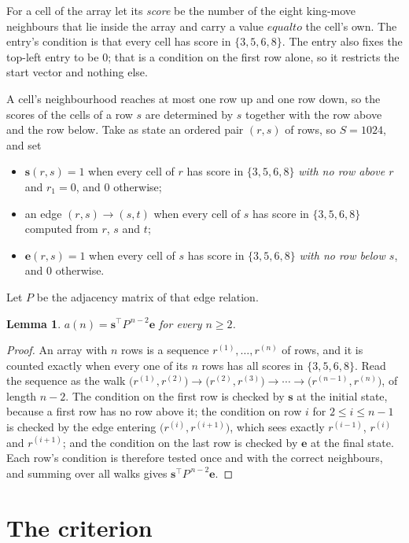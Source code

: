 \documentclass[11pt,a4paper]{article}
\theoremstyle{plain}
\newtheorem{lemma}[theorem]{Lemma}
\theoremstyle{definition}
\begin{document}
For a cell of the array let its \emph{score} be the number of the eight king-move neighbours that lie inside
the array and carry a value $equal to$ the cell's own. The entry's condition is that every cell
has score in $\{3,5,6,8\}$. The entry also fixes the top-left entry to be $0$; that is a condition on the first row alone, so it restricts the start vector and nothing else.

A cell's neighbourhood reaches at most one row up and one row down, so the scores of the
cells of a row $s$ are determined by $s$ together with the row above and the row below.
Take as state an ordered pair $(r,s)$ of rows, so $S=1024$, and set
\begin{itemize}
\item $\mathbf{s}(r,s)=1$ when every cell of $r$ has score in $\{3,5,6,8\}$ \emph{with no row
above $r$} and $r_1=0$, and $0$ otherwise;
\item an edge $(r,s)\to(s,t)$ when every cell of $s$ has score in $\{3,5,6,8\}$ computed from
$r$, $s$ and $t$;
\item $\mathbf{e}(r,s)=1$ when every cell of $s$ has score in $\{3,5,6,8\}$ \emph{with no row
below $s$}, and $0$ otherwise.
\end{itemize}
Let $P$ be the adjacency matrix of that edge relation.

\begin{lemma}\label{lem:walk}
$a(n)=\mathbf{s}^{\!\top}P^{\,n-2}\mathbf{e}$ for every $n\ge2$.
\end{lemma}

\begin{proof}
An array with $n$ rows is a sequence $r^{(1)},\dots,r^{(n)}$ of rows, and it is counted
exactly when every one of its $n$ rows has all scores in $\{3,5,6,8\}$. Read the sequence as the
walk $\bigl(r^{(1)},r^{(2)}\bigr)\to\bigl(r^{(2)},r^{(3)}\bigr)\to\cdots\to
\bigl(r^{(n-1)},r^{(n)}\bigr)$, of length $n-2$. The condition on the first row is
checked by $\mathbf{s}$ at the initial state, because a first row has no row above it; the
condition on row $i$ for $2\le i\le n-1$ is checked by the edge entering
$\bigl(r^{(i)},r^{(i+1)}\bigr)$, which sees exactly $r^{(i-1)}$, $r^{(i)}$ and
$r^{(i+1)}$; and the condition on the last row is checked by $\mathbf{e}$ at the final
state. Each row's condition is therefore tested once and with the correct neighbours, and
summing over all walks gives $\mathbf{s}^{\!\top}P^{\,n-2}\mathbf{e}$.
\end{proof}

\section{The criterion}
\end{document}
